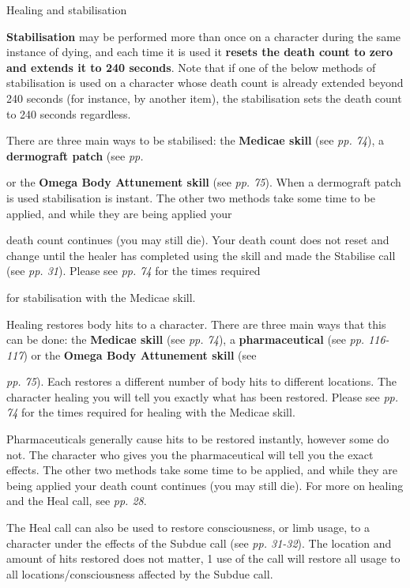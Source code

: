 Healing and stabilisation

\textbf{Stabilisation} may be performed more than once on a character during the same instance of dying, and each time it is used it \textbf{resets the death count to zero and extends it to 240 seconds}. Note that if one of the below methods of stabilisation is used on a character whose death count is already extended beyond 240 seconds (for instance, by another item), the stabilisation sets the death count to 240 seconds regardless.

There are three main ways to be stabilised: the \textbf{Medicae skill} (see \textit{pp. 74}), a \textbf{dermograft patch} (see \textit{pp.}

or the \textbf{Omega Body Attunement skill} (see \textit{pp. 75}). When a dermograft patch is used stabilisation is instant. The other two methods take some time to be applied, and while they are being applied your

death count continues (you may still die). Your death count does not reset and change until the healer has completed using the skill and made the Stabilise call (see \textit{pp. 31}). Please see \textit{pp. 74} for the times required

for stabilisation with the Medicae skill.

Healing restores body hits to a character. There are three main ways that this can be done: the \textbf{Medicae skill} (see \textit{pp. 74}), a \textbf{pharmaceutical} (see \textit{pp. 116-117}) or the \textbf{Omega Body Attunement skill} (see

\textit{pp. 75}). Each restores a different number of body hits to different locations. The character healing you will tell you exactly what has been restored. Please see \textit{pp. 74} for the times required for healing with the Medicae skill.

Pharmaceuticals generally cause hits to be restored instantly, however some do not. The character who gives you the pharmaceutical will tell you the exact effects. The other two methods take some time to be applied, and while they are being applied your death count continues (you may still die). For more on healing and the Heal call, see \textit{pp. 28}.

The Heal call can also be used to restore consciousness, or limb usage, to a character under the effects of the Subdue call (see \textit{pp. 31-32}). The location and amount of hits restored does not matter, 1 use of the call will restore all usage to all locations/consciousness affected by the Subdue call.

